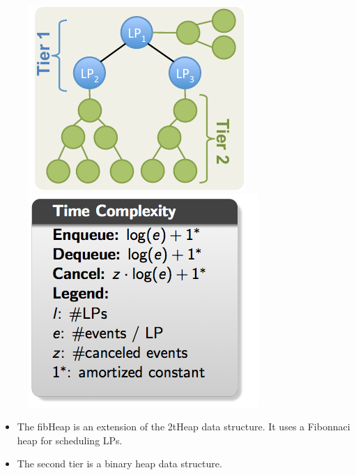 \documentclass[table]{beamer}
\begin{document}
\begin{frame}
\begin{figure}
\centering
\begin{minipage}{0.45\textwidth}
\includegraphics[width=.95\linewidth]{images/2tierQ.pdf}
\end{minipage}
\centering
\begin{minipage}{0.45\textwidth}
\includegraphics[width=.95\linewidth]{images/complexityfibHeap.png}
\end{minipage}
\end{figure}

\begin{itemize}
\item The fibHeap is an extension of the 2tHeap data structure. It uses a Fibonnaci heap for scheduling LPs.
\item The second tier is a binary heap data structure.
\end{itemize}
\end{frame}
\end{document}
